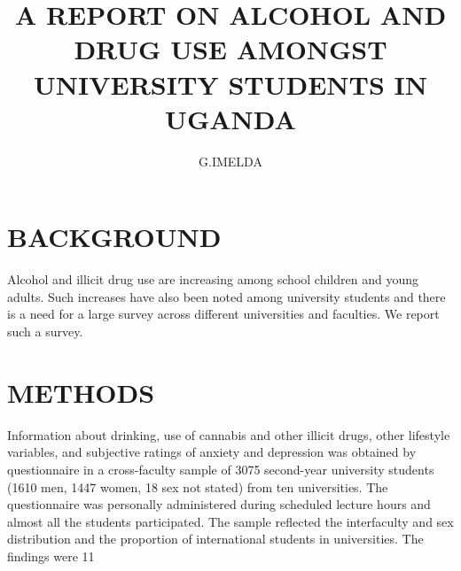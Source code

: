 \documentclass[14pt]{article}
\begin{document}
\author{G.IMELDA}

\title{A REPORT ON ALCOHOL AND DRUG USE AMONGST UNIVERSITY STUDENTS IN UGANDA}

\maketitle

\section{BACKGROUND}
       Alcohol and illicit drug use are increasing among school children and young adults. Such increases have also been noted among university students and there is a need for a large survey across different universities and faculties. We report such a survey. 

\section{METHODS}
Information about drinking, use of cannabis and other illicit drugs, other lifestyle variables, and subjective ratings of anxiety and depression was obtained by questionnaire in a cross-faculty sample of 3075 second-year university students (1610 men, 1447 women, 18 sex not stated) from ten universities. The questionnaire was personally administered during scheduled lecture hours and almost all the students participated. The sample reflected the interfaculty and sex distribution and the proportion of international students in universities.  The findings were 11%
\end{document}
